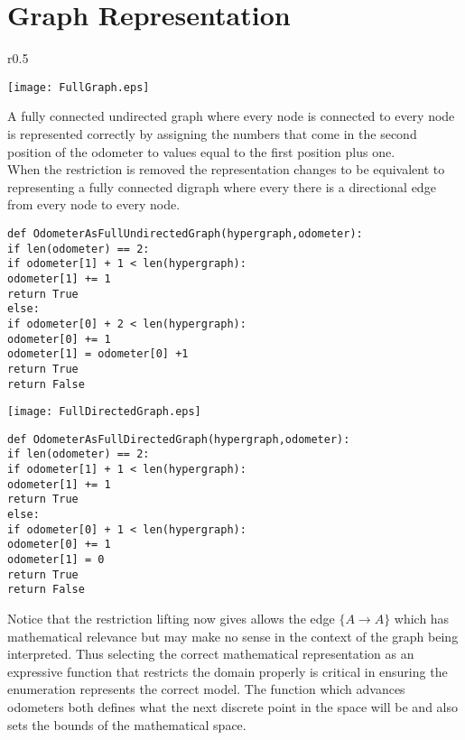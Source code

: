 
\section{Graph Representation}
\begin{wrapfigure}{r}{0.5\textwidth}
	\begin{center}
		\texttt{[image: FullGraph.eps]}
	\end{center}
\end{wrapfigure}

A fully connected undirected graph where every node is connected to every node is represented correctly by assigning the numbers that come in the second position of the odometer to values equal to the first position plus one. \\

When the restriction is removed the representation changes to be equivalent to representing a fully connected digraph where every there is a directional edge from every node to every node. 
\begin{lstlisting}
def OdometerAsFullUndirectedGraph(hypergraph,odometer):
if len(odometer) == 2:
if odometer[1] + 1 < len(hypergraph):
odometer[1] += 1
return True
else:
if odometer[0] + 2 < len(hypergraph):
odometer[0] += 1
odometer[1] = odometer[0] +1
return True
return False
\end{lstlisting}

\begin{center}
	\texttt{[image: FullDirectedGraph.eps]}
\end{center}

\begin{lstlisting}
def OdometerAsFullDirectedGraph(hypergraph,odometer):
if len(odometer) == 2:
if odometer[1] + 1 < len(hypergraph):
odometer[1] += 1
return True
else:
if odometer[0] + 1 < len(hypergraph):
odometer[0] += 1
odometer[1] = 0
return True
return False
\end{lstlisting}

Notice that the restriction lifting now gives allows the edge $\{A \rightarrow A\}$ which has mathematical relevance but may make no sense in the context of the graph being interpreted. Thus selecting the correct mathematical representation as an expressive function that restricts the domain properly is critical in ensuring the enumeration represents the correct model. The function which advances odometers both defines what the next discrete point in the space will be and also sets the bounds of the mathematical space.

